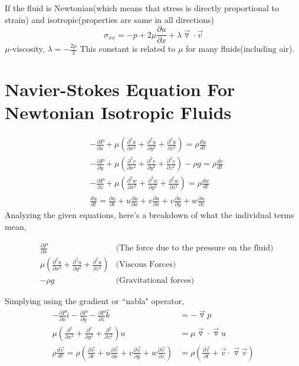 \documentclass{report}
\begin{document}
If the fluid is Newtonian(which means that stress is directly proportional to strain) and isotropic(properties are same in all directions)
\[
  \sigma_{xx} = -p + 2 \mu \frac{\partial u}{\partial x} + \lambda \vec{\triangledown}\cdot\vec{v}
\]
$\mu$-viscosity, $\lambda = -\frac{2\mu}{3}$ This constant is related to $\mu$ for many fluids(including air). 
\section{Navier-Stokes Equation For Newtonian Isotropic Fluids} %
\begin{align*}
  &-\frac{\partial P}{\partial x} + \mu(\frac{\partial^2 u}{\partial x^2} + \frac{\partial^2 u}{\partial y^2} + \frac{\partial^2 u}{\partial z^2}) = \rho \frac{du}{dt} \\
  &-\frac{\partial P}{\partial y} + \mu(\frac{\partial^2 v}{\partial x^2} + \frac{\partial^2 v}{\partial y^2} + \frac{\partial^2 v}{\partial z^2}) - \rho g = \rho \frac{dv}{dt} \\
  &-\frac{\partial P}{\partial z} + \mu(\frac{\partial^2 w}{\partial x^2} + \frac{\partial^2 w}{\partial y^2} + \frac{\partial^2 w}{\partial z^2}) = \rho \frac{dw}{dt} \\
  &\frac{du}{dt} = \frac{\partial u}{\partial t} + u \frac{\partial u}{\partial x} + v\frac{\partial u}{\partial x} + v \frac{\partial u}{\partial y} + w \frac{\partial u}{\partial z}
\end{align*}
Analyzing the given equations, here's a breakdown of what the individual terms mean, 

\begin{align*}
  &\frac{\partial P}{\partial x} &\text{(The force due to the pressure on the fluid)} \\
  &\mu(\frac{\partial^2 u}{\partial x^2} + \frac{\partial^2 u}{\partial y^2} + \frac{\partial^2 u}{\partial z^2}) &\text{(Viscous Forces)} \\
  &-\rho g & \text{(Gravitational forces)}
\end{align*}

Simplying using the gradient or ``nabla" operator, 
\begin{align*}
-\frac{\partial P}{\partial x} \hat{i} - \frac{\partial P}{\partial y}- \frac{\partial P}{\partial z}\hat{k} &= -\vec{\triangledown} p \\ 
    \mu(\frac{\partial^2}{\partial x^2} + \frac{\partial^2}{\partial y^2} + \frac{\partial^2}{\partial z^2})u &= \mu \vec{\triangledown} \cdot \vec{\triangledown} u  \\
    \rho \frac{d \vec{v}}{dt} = \rho(\frac{\partial \vec{v}}{\partial t} + u \frac{\partial \vec{v}}{\partial x} + v \frac{\partial \vec{v}}{\partial y} + w \frac{\partial \vec{v}}{\partial z}) &= \rho(\frac{\partial \vec{v}}{\partial t} + \vec{v} \cdot \vec{\triangledown} \vec{v})
\end{align*}
\end{document}

